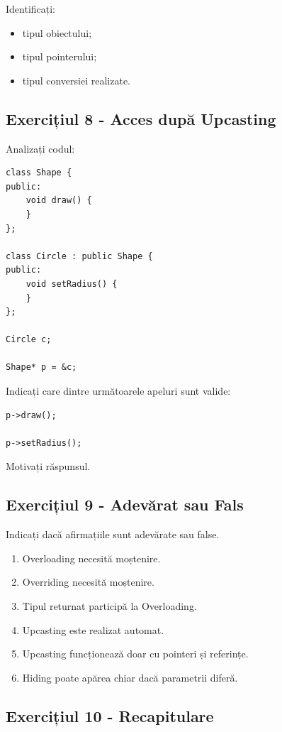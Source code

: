 \documentclass[12pt,a4paper]{article}
\begin{document}
Identificați:

\begin{itemize}
\item tipul obiectului;
\item tipul pointerului;
\item tipul conversiei realizate.
\end{itemize}

\subsection{Exercițiul 8 - Acces după Upcasting}

Analizați codul:

\begin{verbatim}
class Shape {
public:
    void draw() {
    }
};

class Circle : public Shape {
public:
    void setRadius() {
    }
};

Circle c;

Shape* p = &c;
\end{verbatim}

Indicați care dintre următoarele apeluri sunt valide:

\begin{verbatim}
p->draw();

p->setRadius();
\end{verbatim}

Motivați răspunsul.

\subsection{Exercițiul 9 - Adevărat sau Fals}

Indicați dacă afirmațiile sunt adevărate sau false.

\begin{enumerate}
\item Overloading necesită moștenire.
\item Overriding necesită moștenire.
\item Tipul returnat participă la Overloading.
\item Upcasting este realizat automat.
\item Upcasting funcționează doar cu pointeri și referințe.
\item Hiding poate apărea chiar dacă parametrii diferă.
\end{enumerate}

\subsection{Exercițiul 10 - Recapitulare}
\end{document}
